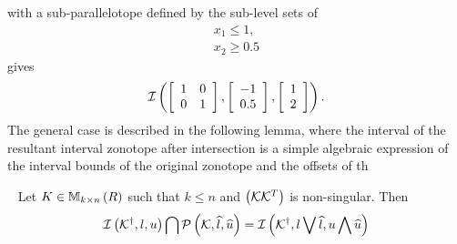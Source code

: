 with a sub-parallelotope defined by the sub-level sets of
%
\begin{align*}
  x_1\leq 1,\\
  x_2\geq 0.5
\end{align*}
%
gives
%
\[
\mathit{\operatorname{\mathcal{I}}}\left(\left[\begin{array}{l
        l}1 & 0 \\ 0 &
      1\end{array}\right],\left[\begin{array}{c}-1\\ 0.5\end{array}\right],\left[\begin{array}{c}1\\ 2\end{array}\right]\right).
\]
%
The general case is described in the following lemma, where the
interval of the resultant interval zonotope after intersection is
a simple algebraic expression of the interval bounds of the original
zonotope and the offsets of th
%
\begin{lemma}~\label{lem:motivation}
Let $K\in\mathbb{M}_{k\times n}\left(R\right)$ such that $k\leq n$ and $\left(\mathcal{K}\mathcal{K}^T\right)$ is
non-singular.  Then
\[
\mathit{\operatorname{\mathcal{I}}}\left(\mathcal{K}^\dagger,l,u\right) \bigcap \mathcal{P}\left(\mathcal{K},\widehat{l},\widehat{u}\right)
= \mathit{\operatorname{\mathcal{I}}}\left(\mathcal{K}^\dagger,l\bigvee \widehat{l},u\bigwedge \widehat{u}\right)
\]
\end{lemma}
